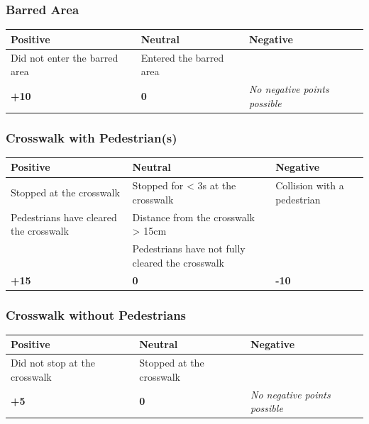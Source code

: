 \subsubsection*{Barred Area}
\begin{table}[H]
	\begin{tabularx}{\textwidth}{XXX}
		\toprule
		\textbf{Positive}             & \textbf{Neutral}        & \textbf{Negative}                    \\
		\midrule
		Did not enter the barred area & Entered the barred area &                                      \\
		\topstrut
		\textbf{+10}                  & \textbf{0}              & \textit{No negative points possible} \\
		\bottomrule
	\end{tabularx}
\end{table}

\subsubsection*{Crosswalk with Pedestrian(s)}
\begin{table}[H]
	\begin{tabularx}{\textwidth}{XXX}
		\toprule
		\textbf{Positive}                      & \textbf{Neutral}                                 & \textbf{Negative}           \\
		\midrule
		Stopped at the crosswalk               & Stopped for < 3s at the crosswalk                & Collision with a pedestrian \\
		Pedestrians have cleared the crosswalk & Distance from the crosswalk > 15cm               &                             \\
		                                       & Pedestrians have not fully cleared the crosswalk &                             \\
		\topstrut
		\textbf{+15}                           & \textbf{0}                                       & \textbf{-10}                \\
		\bottomrule
	\end{tabularx}
\end{table}

\subsubsection*{Crosswalk without Pedestrians}
\begin{table}[H]
	\begin{tabularx}{\textwidth}{XXX}
		\toprule
		\textbf{Positive}             & \textbf{Neutral}         & \textbf{Negative}                    \\
		\midrule
		Did not stop at the crosswalk & Stopped at the crosswalk &                                      \\
		\topstrut
		\textbf{+5}    & \textbf{0}               & \textit{No negative points possible} \\
		\bottomrule
	\end{tabularx}
\end{table}

